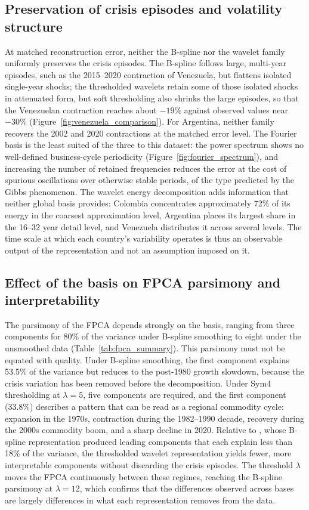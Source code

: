 \subsection{Preservation of crisis episodes and volatility structure}

At matched reconstruction error, neither the B-spline nor the wavelet
family uniformly preserves the crisis episodes. The B-spline follows large,
multi-year episodes, such as the 2015--2020 contraction of Venezuela, but
flattens isolated single-year shocks; the thresholded wavelets retain some
of those isolated shocks in attenuated form, but soft thresholding also
shrinks the large episodes, so that the Venezuelan contraction reaches about
$-19\%$ against observed values near $-30\%$
(Figure~\ref{fig:venezuela_comparison}). For Argentina, neither family
recovers the 2002 and 2020 contractions at the matched error level. The
Fourier basis is the least suited of the three to this dataset: the
power spectrum shows no well-defined business-cycle periodicity
(Figure~\ref{fig:fourier_spectrum}), and increasing the number of
retained frequencies reduces the error at the cost of spurious
oscillations over otherwise stable periods, of the type predicted by the
Gibbs phenomenon. The wavelet energy decomposition adds information that
neither global basis provides: Colombia concentrates approximately 72\%
of its energy in the coarsest approximation level, Argentina places its
largest share in the 16--32 year detail level, and Venezuela distributes it
across several levels. The time scale at which each country's variability operates
is thus an observable output of the representation and not an assumption
imposed on it.

\subsection{Effect of the basis on FPCA parsimony and interpretability}

The parsimony of the FPCA depends strongly on the basis, ranging from
three components for 80\% of the variance under B-spline smoothing to
eight under the unsmoothed data (Table~\ref{tab:fpca_summary}). This
parsimony must not be equated with quality. Under B-spline smoothing,
the first component explains 53.5\% of the variance but reduces to the
post-1980 growth slowdown, because the crisis variation has been removed
before the decomposition. Under Sym4 thresholding at $\lambda = 5$, five
components are required, and the first component (33.8\%) describes a
pattern that can be read as a regional commodity cycle: expansion in the
1970s, contraction during the 1982--1990 decade, recovery during the
2000s commodity boom, and a sharp decline in 2020. Relative to
\cite{padilla2020}, whose B-spline representation produced leading
components that each explain less than 18\% of the variance, the
thresholded wavelet representation yields fewer, more interpretable
components without discarding the crisis episodes. The threshold
$\lambda$ moves the FPCA continuously between these regimes, reaching the
B-spline parsimony at $\lambda = 12$, which confirms that the differences
observed across bases are largely differences in what each
representation removes from the data.

